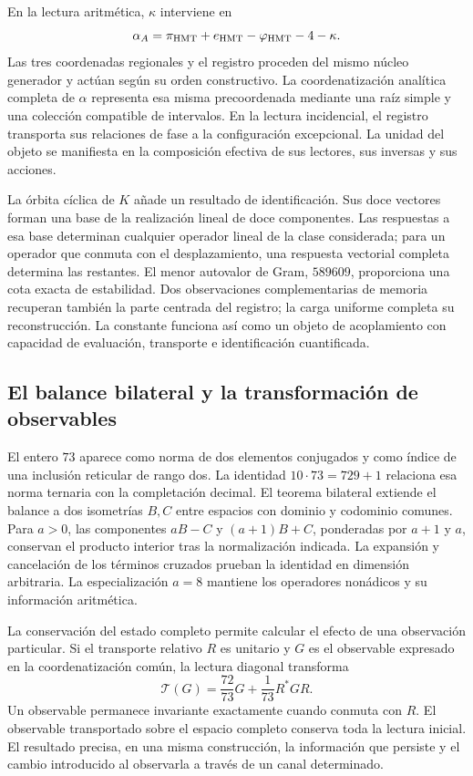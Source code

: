 En la lectura aritmética, \(\kappa\) interviene en
\[
\alpha_A=\pi_{\rm HMT}+e_{\rm HMT}-\varphi_{\rm HMT}-4-\kappa.
\]
Las tres coordenadas regionales y el registro proceden del mismo núcleo generador y actúan según su orden constructivo. La coordenatización analítica completa de \(\alpha\) representa esa misma precoordenada mediante una raíz simple y una colección compatible de intervalos. En la lectura incidencial, el registro transporta sus relaciones de fase a la configuración excepcional. La unidad del objeto se manifiesta en la composición efectiva de sus lectores, sus inversas y sus acciones.

La órbita cíclica de \(K\) añade un resultado de identificación. Sus doce vectores forman una base de la realización lineal de doce componentes. Las respuestas a esa base determinan cualquier operador lineal de la clase considerada; para un operador que conmuta con el desplazamiento, una respuesta vectorial completa determina las restantes. El menor autovalor de Gram, \(589609\), proporciona una cota exacta de estabilidad. Dos observaciones complementarias de memoria recuperan también la parte centrada del registro; la carga uniforme completa su reconstrucción. La constante funciona así como un objeto de acoplamiento con capacidad de evaluación, transporte e identificación cuantificada.

\subsection*{El balance bilateral y la transformación de observables}
El entero \(73\) aparece como norma de dos elementos conjugados y como índice de una inclusión reticular de rango dos. La identidad \(10\cdot73=729+1\) relaciona esa norma ternaria con la completación decimal. El teorema bilateral extiende el balance a dos isometrías \(B,C\) entre espacios con dominio y codominio comunes. Para \(a>0\), las componentes \(aB-C\) y \((a+1)B+C\), ponderadas por \(a+1\) y \(a\), conservan el producto interior tras la normalización indicada. La expansión y cancelación de los términos cruzados prueban la identidad en dimensión arbitraria. La especialización \(a=8\) mantiene los operadores nonádicos y su información aritmética.

La conservación del estado completo permite calcular el efecto de una observación particular. Si el transporte relativo \(R\) es unitario y \(G\) es el observable expresado en la coordenatización común, la lectura diagonal transforma
\[
\mathcal T(G)=\frac{72}{73}G+\frac1{73}R^*GR.
\]
Un observable permanece invariante exactamente cuando conmuta con \(R\). El observable transportado sobre el espacio completo conserva toda la lectura inicial. El resultado precisa, en una misma construcción, la información que persiste y el cambio introducido al observarla a través de un canal determinado.

